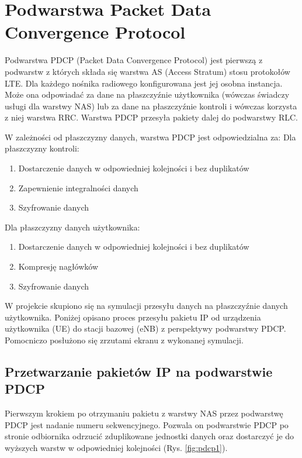 \chapter{Podwarstwa Packet Data Convergence Protocol}
\label{cha:pdcp}


Podwarstwa PDCP (Packet Data Convergence Protocol) jest pierwszą z podwarstw z których składa się warstwa AS (Access Stratum) stosu protokołów LTE. Dla każdego nośnika radiowego konfigurowana jest jej osobna instancja. Może ona odpowiadać za dane na płaszczyźnie użytkownika (wówczas świadczy usługi dla warstwy NAS) lub za dane na płaszczyźnie kontroli i wówczas korzysta z niej warstwa RRC. Warstwa PDCP przesyła pakiety dalej do podwarstwy RLC.

W zależności od płaszczyzny danych, warstwa PDCP jest odpowiedzialna za: 
Dla płaszczyzny kontroli:
\begin{enumerate}
	\item Dostarczenie danych w odpowiedniej kolejności i bez duplikatów 
	\item Zapewnienie integralności danych
	\item Szyfrowanie danych
\end{enumerate}

Dla płaszczyzny danych użytkownika:

\begin{enumerate}
	\item Dostarczenie danych w odpowiedniej kolejności i bez duplikatów
	\item Kompresję nagłówków
	\item Szyfrowanie danych
\end{enumerate}


W projekcie skupiono się na symulacji przesyłu danych na płaszczyźnie danych użytkownika. Poniżej opisano proces przesyłu pakietu IP od urządzenia użytkownika (UE) do stacji bazowej (eNB) z perspektywy podwarstwy PDCP. Pomocniczo posłużono się zrzutami ekranu z wykonanej symulacji.


\section{Przetwarzanie pakietów IP na podwarstwie PDCP}

Pierwszym krokiem po otrzymaniu pakietu z warstwy NAS przez podwarstwę PDCP jest nadanie numeru sekwencyjnego. Pozwala on podwarstwie PDCP po stronie odbiornika odrzucić zduplikowane jednostki danych oraz dostarczyć je do wyższych warstw w odpowiedniej kolejności (Rys. \ref{fig:pdcp1}).

